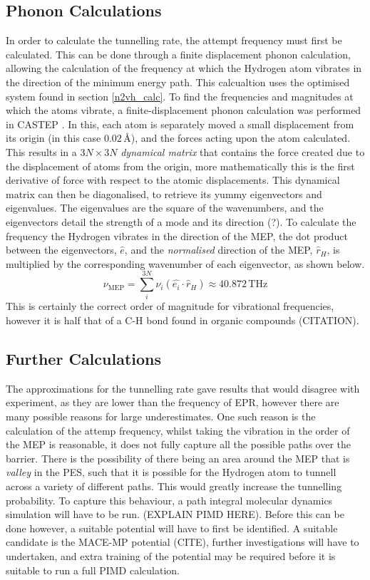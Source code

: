 \documentclass[10pt,a4paper,twocolumn,twoside]{extarticle}
\begin{document}
\subsection{Phonon Calculations}
\label{phonon}
In order to calculate the tunnelling rate, the attempt frequency must first be calculated. This can be done through a finite displacement phonon calculation, allowing the calculation of the frequency at which the Hydrogen atom vibrates in the direction of the minimum energy path. This calcualtion uses the optimised system found in section \ref{n2vh_calc}. To find the frequencies and magnitudes at which the atoms vibrate, a finite-displacement phonon calculation was performed in CASTEP \cite{DynamicalMatrix}. In this, each atom is separately moved a small displacement from its origin (in this case $0.02$\,{\AA}), and the forces acting upon the atom calculated. This results in a $3N\times3N$ \emph{dynamical matrix} that contains the force created due to the displacement of atoms from the origin, more mathematically this is the first derivative of force with respect to the atomic displacements. This dynamical matrix can then be diagonalised, to retrieve its yummy eigenvectors and eigenvalues. The eigenvalues are the square of the wavenumbers, and the eigenvectors detail the strength of a mode and its direction (?). To calculate the frequency the Hydrogen vibrates in the direction of the MEP, the dot product between the eigenvectors, $\hat{e}$, and the \emph{normalised} direction of the MEP, $\hat{r}_H$, is multiplied by the corresponding wavenumber of each eigenvector, as shown below. 
\begin{equation}
    \nu_{\text{MEP}} = \sum_{i}^{3N} \nu_i (\hat{e_i} \cdot \hat{r}_H) \approx 40.872\,\text{THz}
\end{equation}
This is certainly the correct order of magnitude for vibrational frequencies, however it is half that of a C-H bond found in organic compounds (CITATION).

\subsection{Further Calculations}
The approximations for the tunnelling rate gave results that would disagree with experiment, as they are lower than the frequency of EPR, however there are many possible reasons for large underestimates. One such reason is the calculation of the attemp frequency, whilst taking the vibration in the order of the MEP is reasonable, it does not fully capture all the possible paths over the barrier. There is the possibility of there being an area around the MEP that is \emph{valley} in the PES, such that it is possible for the Hydrogen atom to tunnell across a variety of different paths. This would greatly increase the tunnelling probability. To capture this behaviour, a path integral molecular dynamics simulation will have to be run. (EXPLAIN PIMD HERE). Before this can be done however, a suitable potential will have to first be identified. A suitable candidate is the MACE-MP potential (CITE), further investigations will have to undertaken, and extra training of the potential may be required before it is suitable to run a full PIMD calculation.
\end{document}
